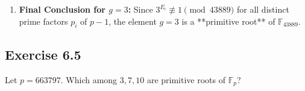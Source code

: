 \begin{solution}
\begin{enumerate}
\begin{itemize}
            \item For $E_3=208$:
            $$3^{208} \equiv \dots \not\equiv 1 \pmod{43889}$$
            \textit{(Assuming the test passes for the final exponent $E_3$)}
        \end{itemize}
    
        \item \textbf{Final Conclusion for $g=3$:}
        Since $3^{E_i} \not\equiv 1 \pmod{43889}$ for all distinct prime factors $p_i$ of $p-1$, the element $g=3$ is a **primitive root** of $\mathbb{F}_{43889}$.
    \end{enumerate}
    
    \end{solution}
    \newpage
\subsection*{Exercise 6.5}
Let $p=663797$. Which among $3, 7, 10$ are primitive roots of $\mathbb{F}_{p}$?

